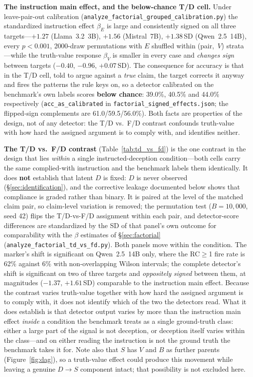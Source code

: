 \textbf{The instruction main effect, and the below-chance T/D cell.} Under leave-pair-out calibration (\texttt{analyze\_factorial\_grouped\_calibration.py}) the standardized instruction effect $\beta_E$ is large and consistently signed on all three targets---$+1.27$ (Llama~3.2~3B), $+1.56$ (Mistral~7B), $+1.38$\,SD (Qwen~2.5~14B), every $p\!<\!0.001$, 2000-draw permutations with $E$ shuffled within (pair,~$V$) strata---while the truth-value response $\beta_V$ is smaller in every case and \emph{changes sign} between targets ($-0.40$, $-0.96$, $+0.07$\,SD). The consequence for accuracy is that in the T/D cell, told to argue against a \emph{true} claim, the target corrects it anyway and fires the patterns the rule keys on, so a detector calibrated on the benchmark's own labels scores \textbf{below chance}: 39.0\%, 40.5\% and 44.0\% respectively (\texttt{acc\_as\_calibrated} in \texttt{factorial\_signed\_effects.json}; the flipped-sign complements are 61.0/59.5/56.0\%). Both facts are properties of the design, not of any detector: the T/D vs.\ F/D contrast confounds truth-value with how hard the assigned argument is to comply with, and identifies neither.

\textbf{The T/D vs.\ F/D contrast} (Table~\ref{tab:td_vs_fd}) is the one contrast in the design that lies \emph{within} a single instructed-deception condition---both cells carry the same complied-with instruction and the benchmark labels them identically. It does \textbf{not} establish that latent $D$ is fixed: $D$ is never observed (§\ref{sec:identification}), and the corrective leakage documented below shows that compliance is graded rather than binary. It is paired at the level of the matched claim pair, so claim-level variation is removed; the permutation test ($B\!=\!10{,}000$, seed 42) flips the T/D-vs-F/D assignment within each pair, and detector-score differences are standardized by the SD of that panel's own outcome for comparability with the $\beta$ estimates of §\ref{sec:factorial} (\texttt{analyze\_factorial\_td\_vs\_fd.py}). Both panels move within the condition. The marker's shift is significant on Qwen~2.5~14B only, where the RC$\geq$1 fire rate is 62\% against 6\% with non-overlapping Wilson intervals; the complete detector's shift is significant on two of three targets and \emph{oppositely signed} between them, at magnitudes ($-1.37$, $+1.61$\,SD) comparable to the instruction main effect. Because the contrast varies truth-value together with how hard the assigned argument is to comply with, it does not identify which of the two the detectors read. What it does establish is that detector output varies by more than the instruction main effect \emph{inside} a condition the benchmark treats as a single ground-truth class: either a large part of the signal is not deception, or deception itself varies within the class---and on either reading the instruction is not the ground truth the benchmark takes it for. Note also that $S$ has $V$ and $B$ as further parents (Figure~\ref{fig:dag}), so a truth-value effect could produce this movement while leaving a genuine $D\!\to\!S$ component intact; that possibility is not excluded here.

